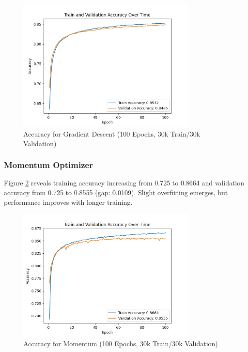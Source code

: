 \documentclass{article}
\begin{document}
\begin{figure}[H]
    \centering
    \includegraphics[width=0.8\textwidth]{assets/q2/gradient_descent/accuracy_100_epochs_30k_train_split.png}
    \caption{Accuracy for Gradient Descent (100 Epochs, 30k Train/30k Validation)}
    \label{fig:gd_accuracy_100}
\end{figure}

\subsubsection{Momentum Optimizer}

Figure \ref{fig:momentum_accuracy_100} reveals training accuracy increasing from 0.725 to 0.8664 and validation accuracy from 0.725 to 0.8555 (gap: 0.0109). Slight overfitting emerges, but performance improves with longer training.

\begin{figure}[H]
    \centering
    \includegraphics[width=0.8\textwidth]{assets/q2/momentum/accuracy_100_epochs_30k_train_split.png}
    \caption{Accuracy for Momentum (100 Epochs, 30k Train/30k Validation)}
    \label{fig:momentum_accuracy_100}
\end{figure}
\end{document}
